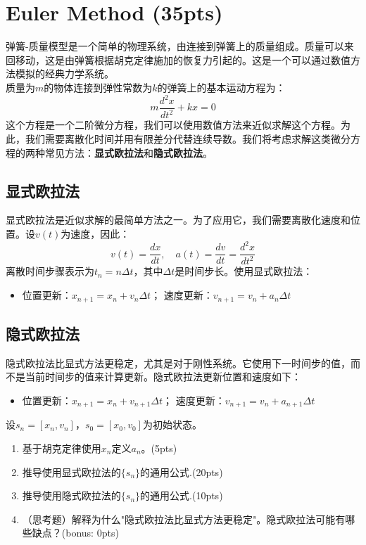 \section{Euler Method (35pts)}
弹簧-质量模型是一个简单的物理系统，由连接到弹簧上的质量组成。质量可以来回移动，这是由弹簧根据胡克定律施加的恢复力引起的。这是一个可以通过数值方法模拟的经典力学系统。\\
质量为$m$的物体连接到弹性常数为$k$的弹簧上的基本运动方程为：
\[
m \frac{d^2x}{dt^2} + kx = 0
\]
这个方程是一个二阶微分方程，我们可以使用数值方法来近似求解这个方程。为此，我们需要离散化时间并用有限差分代替连续导数。我们将考虑求解这类微分方程的两种常见方法：\textbf{显式欧拉法}和\textbf{隐式欧拉法}。
\subsection*{显式欧拉法}
显式欧拉法是近似求解的最简单方法之一。为了应用它，我们需要离散化速度和位置。设$v(t)$为速度，因此：
\[
v(t) = \frac{dx}{dt}, \quad a(t) = \frac{dv}{dt} = \frac{d^2x}{dt^2}
\]
离散时间步骤表示为$t_n = n \Delta t$，其中$\Delta t$是时间步长。使用显式欧拉法：
\begin{itemize}
	\item 位置更新：$x_{n+1} = x_n + v_n \Delta t$；    速度更新：$v_{n+1} = v_n + a_n \Delta t$
\end{itemize}
\subsection*{隐式欧拉法}
隐式欧拉法比显式方法更稳定，尤其是对于刚性系统。它使用下一时间步的值，而不是当前时间步的值来计算更新。隐式欧拉法更新位置和速度如下：
\begin{itemize}
	\item 位置更新：$x_{n+1} = x_n + v_{n+1} \Delta t$；    速度更新：$v_{n+1} = v_n + a_{n+1} \Delta t$
\end{itemize}
设$s_n = [x_n, v_n]$，$s_0 = [x_0, v_0]$为初始状态。
\begin{enumerate}
	\item 基于胡克定律使用$x_n$定义$a_n$。(5pts)
	\item 推导使用显式欧拉法的$\{s_n\}$的通用公式.(20pts)
	\item 推导使用隐式欧拉法的$\{s_n\}$的通用公式.(10pts)
	\item （思考题）解释为什么"隐式欧拉法比显式方法更稳定"。隐式欧拉法可能有哪些缺点？(bonus: 0pts)
\end{enumerate}

